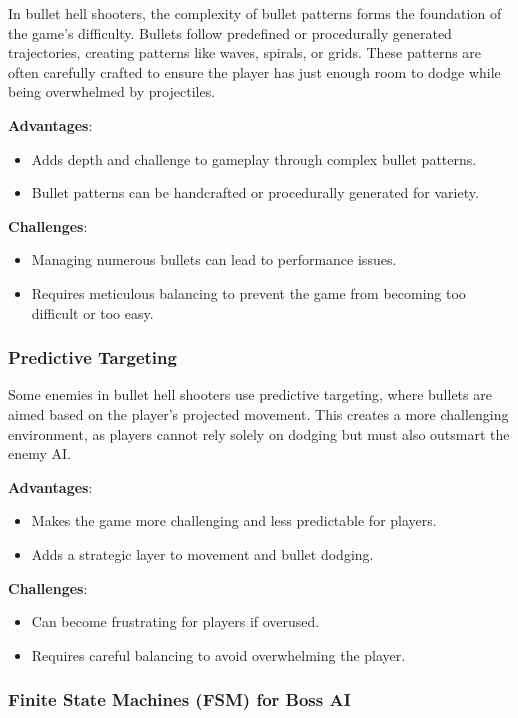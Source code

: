 \documentclass{article} %
\begin{document}
In bullet hell shooters, the complexity of bullet patterns forms the foundation of the game's difficulty. Bullets follow predefined or procedurally generated trajectories, creating patterns like waves, spirals, or grids. These patterns are often carefully crafted to ensure the player has just enough room to dodge while being overwhelmed by projectiles.

\textbf{Advantages}:
\begin{itemize}
	\item Adds depth and challenge to gameplay through complex bullet patterns.
	\item Bullet patterns can be handcrafted or procedurally generated for variety.
\end{itemize}

\textbf{Challenges}:
\begin{itemize}
	\item Managing numerous bullets can lead to performance issues.
	\item Requires meticulous balancing to prevent the game from becoming too difficult or too easy.
\end{itemize}

\subsubsection{Predictive Targeting}

Some enemies in bullet hell shooters use predictive targeting, where bullets are aimed based on the player's projected movement. This creates a more challenging environment, as players cannot rely solely on dodging but must also outsmart the enemy AI.

\textbf{Advantages}:
\begin{itemize}
	\item Makes the game more challenging and less predictable for players.
	\item Adds a strategic layer to movement and bullet dodging.
\end{itemize}

\textbf{Challenges}:
\begin{itemize}
	\item Can become frustrating for players if overused.
	\item Requires careful balancing to avoid overwhelming the player.
\end{itemize}

\subsubsection{Finite State Machines (FSM) for Boss AI}
\end{document}
